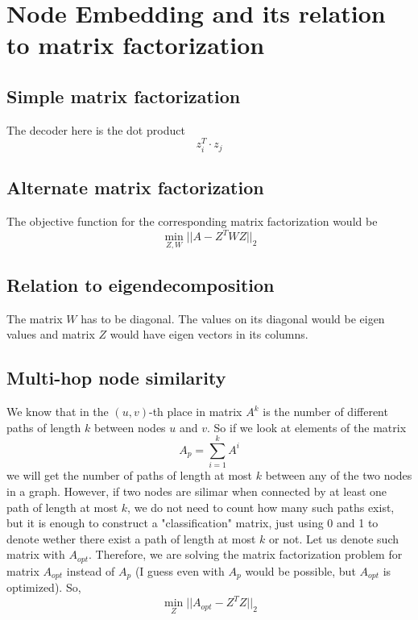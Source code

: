 \documentclass[a4paper,11pt]{article}
\begin{document}

\section{Node Embedding and its relation to matrix factorization}

\subsection{Simple matrix factorization}

The decoder here is the dot product
$$
z_i ^ T \cdot z_j
$$


\subsection{Alternate matrix factorization}

The objective function for the corresponding matrix factorization would be 
$$
\min_{Z, W} || A - Z^TWZ ||_2
$$


\subsection{Relation to eigendecomposition}

The matrix $W$ has to be diagonal. The values on its diagonal would be eigen values and matrix $Z$ would have eigen vectors in its columns.


\subsection{Multi-hop node similarity}

We know that in the $(u, v)$-th place in matrix $A^k$ is the number of different paths of length $k$ between nodes $u$ and $v$. 
So if we look at elements of the matrix 
$$
A_p = \sum_{i = 1}^k A^i
$$
we will get the number of paths of length at most $k$ between any of the two nodes in a graph.
However, if two nodes are silimar when connected by at least one path of length at most $k$, we do not need to count how many such paths exist, 
but it is enough to construct a "classification" matrix, just using 0 and 1 to denote wether there exist a path of length at most $k$ or not. Let us denote such matrix with $A_{opt}$.
Therefore, we are solving the matrix factorization problem for matrix $A_{opt}$ instead of $A_p$ (I guess even with $A_p$ would be possible, but $A_{opt}$ is optimized).
So,
$$
\min_Z || A_{opt} - Z^T Z ||_2
$$
\end{document}
